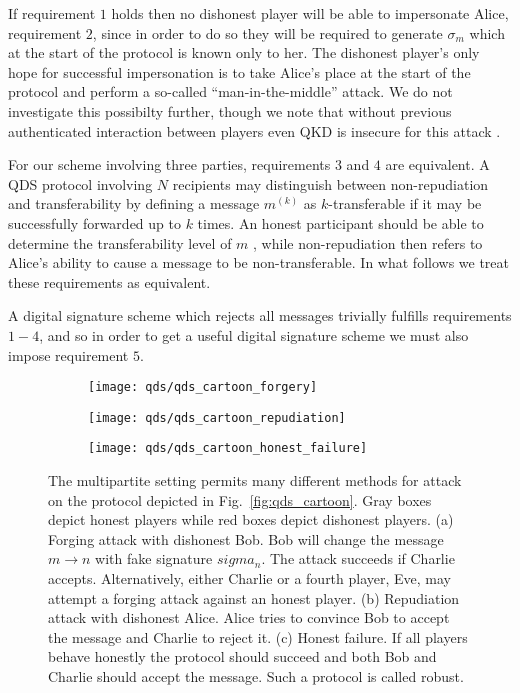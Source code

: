 If requirement $1$ holds then no dishonest player will be able to impersonate Alice, requirement $2$, since in order to do so they will be required to generate $\sigma_m$ which at the start of the protocol is known only to her. The dishonest player's only hope for successful impersonation is to take Alice's place at the start of the protocol and perform a so-called ``man-in-the-middle'' attack. We do not investigate this possibilty further, though we note that without previous authenticated interaction between players even QKD is insecure for this attack \cite{Broadbent2015}.

For our scheme involving three parties, requirements $3$ and $4$ are equivalent. A QDS protocol involving $N$ recipients may distinguish between non-repudiation and transferability by defining a message $m^{\left(k\right)}$ as $k$-transferable if it may be successfully forwarded up to $k$ times. An honest participant should be able to determine the transferability level of $m$ \cite{Arrazola2016}, while non-repudiation then refers to Alice's ability to cause a message to be non-transferable. In what follows we treat these requirements as equivalent.

A digital signature scheme which rejects all messages trivially fulfills requirements $1-4$, and so in order to get a useful digital signature scheme we must also impose requirement $5$.

\begin{figure}[htp]
\centering
	\begin{subfigure}{\linewidth}
		\centering
		\texttt{[image: qds/qds\_cartoon\_forgery]}
		\caption{\label{fig:attacks_forgery}}
	\end{subfigure}
	\begin{subfigure}{\linewidth}
		\centering
		\texttt{[image: qds/qds\_cartoon\_repudiation]}
		\caption{\label{fig:attacks_repudiation}}
	\end{subfigure}
	\begin{subfigure}{\linewidth}
		\centering
		\texttt{[image: qds/qds\_cartoon\_honest\_failure]}
		\caption{\label{fig:attacks_robustness}}
	\end{subfigure}
\caption{\label{fig:qds_attacks} The multipartite setting permits many different methods for attack on the protocol depicted in Fig.~\ref{fig:qds_cartoon}. Gray boxes depict honest players while red boxes depict dishonest players. (a) Forging attack with dishonest Bob. Bob will change the message $m \rightarrow n$ with fake signature $sigma_n$. The attack succeeds if Charlie accepts. Alternatively, either Charlie or a fourth player, Eve, may attempt a forging attack against an honest player. (b) Repudiation attack with dishonest Alice. Alice tries to convince Bob to accept the message and Charlie to reject it. (c) Honest failure. If all players behave honestly the protocol should succeed and both Bob and Charlie should accept the message. Such a protocol is called robust.}
\end{figure}

